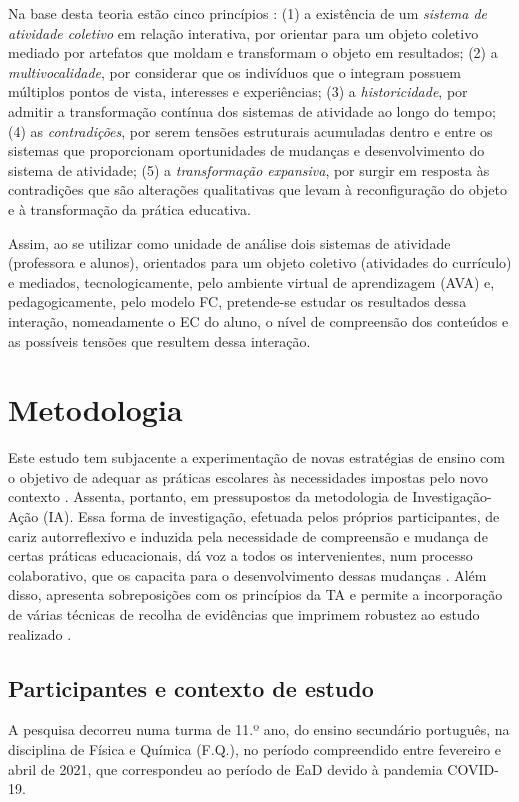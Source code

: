 \documentclass[portuguese]{textolivre}
\begin{document}
Na base desta teoria estão cinco princípios \cite{engestrom_expansive_2001}: (1) a existência de um \textit{sistema de atividade coletivo} em relação interativa, por orientar para um objeto coletivo mediado por artefatos que moldam e transformam o objeto em resultados; (2) a \textit{multivocalidade}, por considerar que os indivíduos que o integram possuem múltiplos pontos de vista, interesses e experiências; (3) a \textit{historicidade}, por admitir a transformação contínua dos sistemas de atividade ao longo do tempo; (4) as \textit{contradições}, por serem tensões estruturais acumuladas dentro e entre os sistemas que proporcionam oportunidades de mudanças e desenvolvimento do sistema de atividade; (5) a \textit{transformação expansiva}, por surgir em resposta às contradições que são alterações qualitativas que levam à reconfiguração do objeto e à transformação da prática educativa.

Assim, ao se utilizar como unidade de análise dois sistemas de atividade (professora e alunos), orientados para um objeto coletivo (atividades do currículo) e mediados, tecnologicamente, pelo ambiente virtual de aprendizagem (AVA) e, pedagogicamente, pelo modelo FC, pretende-se estudar os resultados dessa interação, nomeadamente o EC do aluno, o nível de compreensão dos conteúdos e as possíveis tensões que resultem dessa interação.

\section{Metodologia}\label{sec-normas}
Este estudo tem subjacente a experimentação de novas estratégias de ensino com o objetivo de adequar as práticas escolares às necessidades impostas pelo novo contexto \cite{maximo-esteves_visao_2008}. Assenta, portanto, em pressupostos da metodologia de Investigação-Ação (IA). Essa forma de investigação, efetuada pelos próprios participantes, de cariz autorreflexivo e induzida pela necessidade de compreensão e mudança de certas práticas educacionais, dá voz a todos os intervenientes, num processo colaborativo, que os capacita para o desenvolvimento dessas mudanças \cite{coutinho_investigacao-accao_2009}. Além disso, apresenta sobreposições com os princípios da TA e permite a incorporação de várias técnicas de recolha de evidências que imprimem robustez ao estudo realizado \cite{coutinho_investigacao-accao_2009}.

\subsection{Participantes e contexto de estudo}\label{sec-conduta}
A pesquisa decorreu numa turma de 11.º ano, do ensino secundário português, na disciplina de Física e Química (F.Q.), no período compreendido entre fevereiro e abril de 2021, que correspondeu ao período de EaD devido à pandemia COVID-19.   
\end{document}
